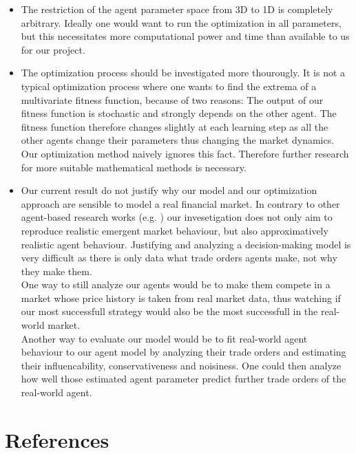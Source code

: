\documentclass[11pt]{article}
\begin{document}
\begin{itemize}
  \item The restriction of the agent parameter space from 3D to 1D is completely arbitrary. Ideally one would want to run the optimization in all parameters, but this necessitates more computational power and time than available to us for our project.
  \item The optimization process should be investigated more thourougly. It is not a typical optimization process where one wants to find the extrema of a multivariate fitness function, because of two reasons: The output of our fitness function is stochastic and strongly depends on the other agent. The fitness function therefore changes slightly at each learning step as all the other agents change their parameters thus changing the market dynamics. Our optimization method naively ignores this fact. Therefore further research for more suitable mathematical methods is necessary.
  \item Our current result do not justify why our model and our optimization approach are sensible to model a real financial market. In contrary to other agent-based research works (e.g. \cite{raberto2001agent}) our invesetigation does not only aim to reproduce realistic emergent market behaviour, but also approximatively realistic agent behaviour. Justifying and analyzing a decision-making model is very difficult as there is only data what trade orders agents make, not why they make them. \\
  One way to still analyze our agents would be to make them compete in a market whose price history is taken from real market data, thus watching if our most successfull strategy would also be the most successfull in the real-world market. \\
  Another way to evaluate our model would be to fit real-world agent behaviour to our agent model by analyzing their trade orders and estimating their influencability, conservativeness and noisiness. One could then analyze how well those estimated agent parameter predict further trade orders of the real-world agent.
\end{itemize}


\section{References}


\end{document}
